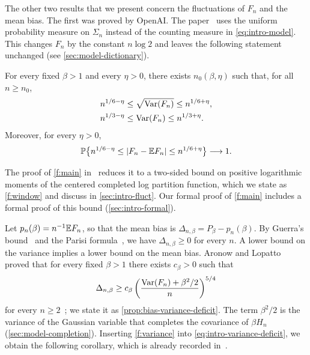 The other two results that we present concern the fluctuations of $F_n$ and
the mean bias. The first was proved by OpenAI. The
paper~\cite{oai-fluctuations} uses the uniform probability measure on
$\Sigma_n$ instead of the counting measure in \eqref{eq:intro-model}. This
changes $F_n$ by the constant $n\log2$ and leaves the following statement
unchanged (see \cref{sec:model-dictionary}).

\begin{theorem}\label{f:main}
For every fixed $\beta>1$ and every $\eta>0$, there exists $n_0(\beta,\eta)$
such that, for all $n\ge n_0$,
\begin{align}
 n^{1/6-\eta}&\le\sqrt{\operatorname{Var}(F_n)}\le n^{1/6+\eta},\label{f:sd}\\
 n^{1/3-\eta}&\le\operatorname{Var}(F_n)\le n^{1/3+\eta}.\label{f:variance}
\end{align}
Moreover, for every $\eta>0$,
\begin{equation}\label{f:typical}
 \mathbb P\bigl\{n^{1/6-\eta}\le\lvert F_n-\mathbb E F_n\rvert\le n^{1/6+\eta}\bigr\}
 \longrightarrow1.
\end{equation}
\end{theorem}

The proof of \cref{f:main} in~\cite{oai-fluctuations} reduces it to a
two-sided bound on positive logarithmic moments of the centered completed
log partition function, which we state as \cref{f:window} and discuss in
\cref{sec:intro-fluct}. Our formal proof of
\cref{f:main} includes a formal proof of this bound
(\cref{sec:intro-formal}).

Let $p_n(\beta)=n^{-1}\mathbb E F_n$, so that the mean bias is
$\Delta_{n,\beta}=P_\beta-p_n(\beta)$. By Guerra's
bound~\cite[Theorem~3]{guerra-2003} and the Parisi
formula~\cite[Theorem~1.1]{parisi-formula}, we have $\Delta_{n,\beta}\ge0$
for every $n$. A lower bound on the variance implies a lower bound on the
mean bias. Aronow and Lopatto proved that for every fixed $\beta>1$ there
exists $c_\beta>0$ such that
\begin{equation}\label{eq:intro-variance-deficit}
 \Delta_{n,\beta}\ge c_\beta\left(\frac{\operatorname{Var}(F_n)+\beta^2/2}{n}\right)^{5/4}
\end{equation}
for every $n\ge2$~\cite[Lemma~7.4 and Remark~7.14, equation~(7.68)]{quantitative-parisi};
we state it as \cref{prop:bias-variance-deficit}. The term $\beta^2/2$ is
the variance of the Gaussian variable that completes the covariance of
$\beta H_n$ (\cref{sec:model-completion}). Inserting \eqref{f:variance}
into \eqref{eq:intro-variance-deficit}, we obtain the following corollary,
which is already recorded in~\cite[Section~1.6, p.~11]{hexagon-bias}.

